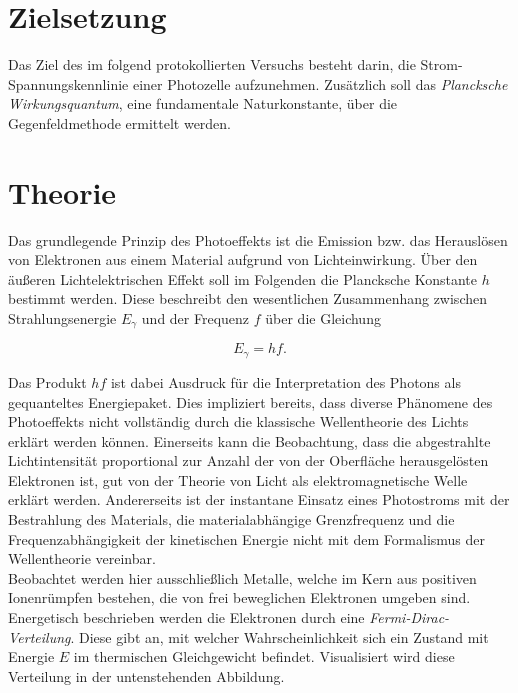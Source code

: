 %

%

\section{Zielsetzung}
\label{sec:Zielsetzung}

Das Ziel des im folgend protokollierten Versuchs besteht darin, die Strom- Spannungskennlinie einer Photozelle aufzunehmen. Zusätzlich soll das \emph{Plancksche
Wirkungsquantum}, eine fundamentale Naturkonstante, über die Gegenfeldmethode ermittelt werden.

\section{Theorie}
\label{sec:Theorie}

Das grundlegende Prinzip des Photoeffekts ist die Emission bzw. das Herauslösen von Elektronen aus einem Material aufgrund von Lichteinwirkung. Über den äußeren 
Lichtelektrischen Effekt soll im Folgenden die Plancksche Konstante $h$ bestimmt werden. Diese beschreibt den wesentlichen Zusammenhang zwischen Strahlungsenergie
$E_\gamma$ und der Frequenz $f$ über die Gleichung 

\begin{equation*}
    E_\gamma = hf.
\end{equation*}

\noindent Das Produkt $hf$ ist dabei Ausdruck für die Interpretation des Photons als gequanteltes Energiepaket. Dies impliziert bereits, dass diverse Phänomene des 
Photoeffekts nicht vollständig durch die klassische Wellentheorie des Lichts erklärt werden können. Einerseits kann die Beobachtung, dass die abgestrahlte Lichtintensität 
proportional zur Anzahl der von der Oberfläche herausgelösten Elektronen ist, gut von der Theorie von Licht als elektromagnetische Welle erklärt werden. 
Andererseits ist der instantane Einsatz eines Photostroms mit der Bestrahlung des Materials, die materialabhängige Grenzfrequenz und die Frequenzabhängigkeit der 
kinetischen Energie nicht mit dem Formalismus der Wellentheorie vereinbar.\\

\noindent Beobachtet werden hier ausschließlich Metalle, welche im Kern aus positiven Ionenrümpfen bestehen, die von frei beweglichen Elektronen umgeben sind. Energetisch
beschrieben werden die Elektronen durch eine \emph{Fermi-Dirac-Verteilung}. Diese gibt an, mit welcher Wahrscheinlichkeit sich ein Zustand mit Energie $E$ im thermischen 
Gleichgewicht befindet. Visualisiert wird diese Verteilung in der untenstehenden Abbildung.

